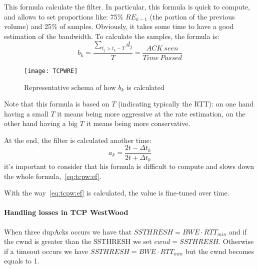 This formula calculate the filter. In particular, this formula is quick to
compute, and allows to set proportions like: 75\% $RE_{k-1}$ (the portion of the
previous volume) and 25\% of samples. Obviously, it takes some time to have a
good estimation of the bandwidth.
To calculate the samples, the formula is:
\begin{equation}
b_k = \frac{\sum_{t_j > t_k-T} d_j }{T} = \frac{ACK\ seen}{Time\ Passed}
\end{equation}

\begin{figure}[t]
  \centering
  \texttt{[image: TCPWRE]}
  \caption[Graphical $b_k$ representation]{Representative schema of how $b_k$ is
    calculated}
  \label{fig:tcpw:TCPWRE}
\end{figure}

Note that this formula is based on $T$ (indicating typically the RTT): on one
hand having a small $T$ it means being more aggressive at the rate estimation,
on the other hand having a big $T$ it means being more conservative.


At the end, the filter is calculated another time:
\begin{equation}
a_k = \frac{2t - \Delta t_k}{2t + \Delta t_k}
\end{equation}
it's important to consider that his formula is difficult to compute and slows
down the whole formula,~\ref{eq:tcpw:ef}.

With the way~\ref{eq:tcpw:ef} is calculated, the value is fine-tuned over time.

\paragraph*{Handling losses in TCP WestWood} When three dupAcks occurs
we have that $SSTHRESH = BWE \cdot RTT_{min}$ and if the cwnd is greater than
the SSTHRESH we set $cwnd=SSTHRESH$.
Otherwise if a timeout occurs we have $SSTHRESH = BWE \cdot RTT_{min}$ but the
cwnd becomes equals to 1.

